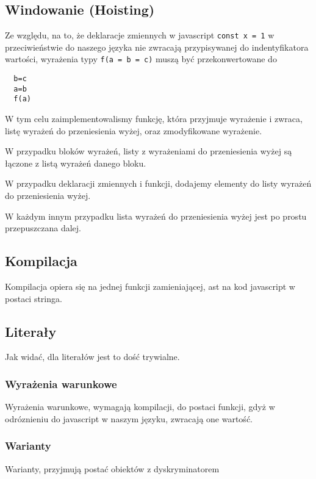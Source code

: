 \documentclass{article}
\begin{document}
\subsection{Windowanie (Hoisting)}
Ze względu, na to, że deklaracje zmiennych w javascript \lstinline{const x = 1} w przeciwieństwie do naszego języka nie zwracają przypisywanej do indentyfikatora wartości, wyrażenia typy \lstinline{f(a = b = c)} muszą być przekonwertowane do
\begin{lstlisting}
  b=c
  a=b
  f(a)
\end{lstlisting}
W tym celu zaimplementowalismy funkcję, która przyjmuje wyrażenie i zwraca, listę wyrażeń do przeniesienia wyżej, oraz zmodyfikowane wyrażenie.

W przypadku bloków wyrażeń, listy z wyrażeniami do przeniesienia wyżej są łączone z listą wyrażeń danego bloku.



W przypadku deklaracji zmiennych i funkcji, dodajemy elementy do listy wyrażeń do przeniesienia wyżej.\newpage

W każdym innym przypadku lista wyrażeń do przeniesienia wyżej jest po prostu przepuszczana dalej.



\subsection{Kompilacja}
Kompilacja opiera się na jednej funkcji zamieniającej, ast na kod javascript w postaci stringa.

\subsection{Literały}
Jak widać, dla literałów jest to dość trywialne.


\subsubsection{Wyrażenia warunkowe}
Wyrażenia warunkowe, wymagają kompilacji, do postaci funkcji, gdyż w odróznieniu do javascript w naszym języku, zwracają one wartość.


\subsubsection{Warianty}
Warianty, przyjmują postać obiektów z dyskryminatorem

\end{document}
